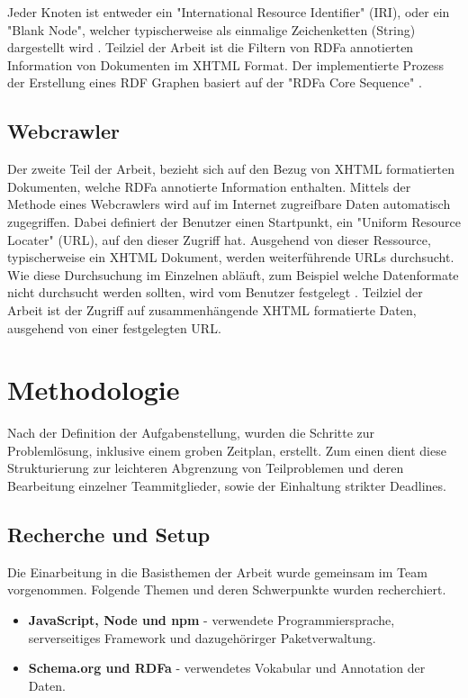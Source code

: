 \documentclass[hidelinks, a4paper, 11pt]{article} %
\begin{document}
Jeder Knoten ist entweder ein "International Resource Identifier" (IRI), oder ein "Blank Node", welcher typischerweise als einmalige Zeichenketten (String) dargestellt wird \cite{adida2008rdfa}. Teilziel der Arbeit ist die Filtern von RDFa annotierten Information von Dokumenten im XHTML Format. Der implementierte Prozess der Erstellung eines RDF Graphen basiert auf der "RDFa Core Sequence" \cite{rdfaSequence}.

\subsection{Webcrawler}

Der zweite Teil der Arbeit, bezieht sich auf den Bezug von XHTML formatierten Dokumenten, welche RDFa annotierte Information enthalten. Mittels der Methode eines Webcrawlers wird auf im Internet zugreifbare Daten automatisch zugegriffen. Dabei definiert der Benutzer einen Startpunkt, ein "Uniform Resource Locater" (URL), auf den dieser Zugriff hat. Ausgehend von dieser Ressource, typischerweise ein XHTML Dokument, werden weiterf\"uhrende URLs durchsucht. Wie diese Durchsuchung im Einzelnen abl\"auft, zum Beispiel welche Datenformate nicht durchsucht werden sollten, wird vom Benutzer festgelegt \cite{pinkerton2000webcrawler}. 
Teilziel der Arbeit ist der Zugriff auf zusammenh\"angende XHTML formatierte Daten, ausgehend von einer festgelegten URL.



\section{Methodologie}

Nach der Definition der Aufgabenstellung, wurden die Schritte zur Probleml\"osung, inklusive einem groben Zeitplan, erstellt. Zum einen dient diese Strukturierung zur leichteren Abgrenzung von Teilproblemen und deren Bearbeitung einzelner Teammitglieder, sowie der Einhaltung strikter Deadlines.

\subsection{Recherche und Setup}

Die Einarbeitung in die Basisthemen der Arbeit wurde gemeinsam im Team vorgenommen. Folgende Themen und deren Schwerpunkte wurden recherchiert.

\begin{itemize}
\item \textbf{JavaScript, Node und npm} - verwendete Programmiersprache, serverseitiges Framework und dazugeh\"orirger Paketverwaltung.
\item \textbf{Schema.org und RDFa} - verwendetes Vokabular und Annotation der Daten.
\end{itemize}
\end{document}
